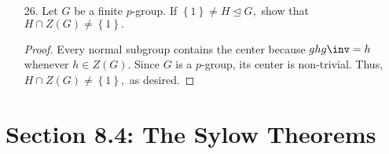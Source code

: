 \documentclass{article}
\begin{document}
\begin{itemize}
\begin{proof}
			In the case $n=3,$ three polynomials that are always fixed are 
			\begin{align*}
				f_1(x_1, x_2, x_3) &= x_1 + x_2+x_3 \\
				f_2(x_1, x_2, x_3) &= x_1^2+x_2^2+x_3^2 \\
				f_3(x_1, x_2, x_3) &= 2x_1+2x_2+2x_3
			\end{align*}
			If $g(x_1, x_2, x_3)=x_1+x_2$ and $S_3=\left\{ \varepsilon, (123), (132), (12), (13), (23) \right\}$ then we have
			\begin{align*}
				\varepsilon\cdot g(x_1, x_2, x_3) &= x_1+x_2 \\
				(123)\cdot g(x_1, x_2, x_3) &= g(x_2, x_3, x_1) = x_2+x_3 \\
				(132) \cdot g(x_1, x_2, x_3) &= g(x_3, x_1, x_2) = x_3+x_1 \\
				(12) \cdot g(x_1, x_2, x_3) &= g(x_2, x_1, x_3) = x_2+x_1 \\
				(13)\cdot g(x_1, x_2, x_3) &= g(x_3, x_2, x_1) = x_3+x_2 \\
				(23) \cdot g(x_1, x_2, x_3) &= g(x_1, x_3, x_2) = x_1+x_3
			\end{align*}
			So let $g_1=x_1+x_3$ and $g_2=x_2+x_3.$ Then $S_3\cdot g=\left\{ g, g_1, g_2 \right\}.$

			From above, we see elements that fix $g$ are just $\varepsilon$ and (12), so $S(g)=\left\{ \varepsilon, (12) \right\}.$
			
		\end{proof}

	\item[26.] Let $G$ be a finite $p$-group. If $\left\{ 1 \right\}\neq H\unlhd G,$ show that $H\cap Z(G)\neq \left\{ 1 \right\}.$ 
		\begin{proof}
			Every normal subgroup contains the center because $ghg\inv=h$ whenever $h\in Z(G).$ Since $G$ is a $p$-group, its center is non-trivial. Thus, $H\cap Z(G)\neq \left\{ 1 \right\},$ as desired.
			
		\end{proof}
		
\end{itemize}

\section*{Section 8.4: The Sylow Theorems}
\end{document}
